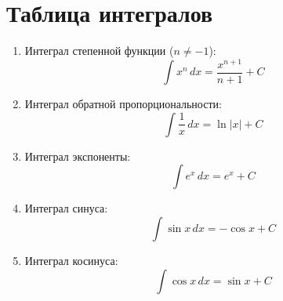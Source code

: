 \documentclass[12pt]{article}
\begin{document}
\section*{Таблица интегралов}

\begin{enumerate}
    \item Интеграл степенной функции ($n \neq -1$):
    \[
    \int x^n \, dx = \frac{x^{n+1}}{n+1} + C
    \]
    
    \item Интеграл обратной пропорциональности:
    \[
    \int \frac{1}{x} \, dx = \ln|x| + C
    \]
    
    \item Интеграл экспоненты:
    \[
    \int e^x \, dx = e^x + C
    \]
    
    \item Интеграл синуса:
    \[
    \int \sin x \, dx = -\cos x + C
    \]
    
    \item Интеграл косинуса:
    \[
    \int \cos x \, dx = \sin x + C
    \]
\end{enumerate}
\end{document}
